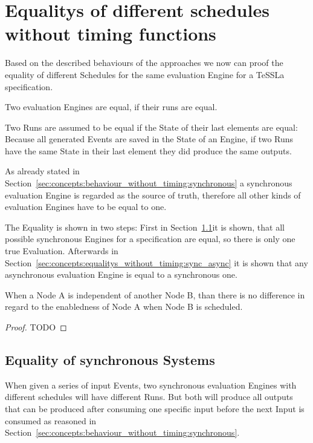 \section{Equalitys of different schedules without timing functions}
\label{sec:concepts:equalitys_without_timing}

Based on the described behaviours of the approaches we now can proof the equality of different Schedules for the same evaluation Engine for a TeSSLa specification.

\begin{lemma}
  Two evaluation Engines are equal, if their runs are equal.
\label{lemma:eval_equal_if_runs_equal}
\end{lemma}

Two Runs are assumed to be equal if the State of their last elements are equal:
Because all generated Events are saved in the State of an Engine, if two Runs have the same State in their last element they did produce the same outputs.


As already stated in Section~\ref{sec:concepts:behaviour_without_timing:synchronous} a synchronous evaluation Engine is regarded as the source of truth, therefore all other kinds of evaluation Engines have to be equal to one.

The Equality is shown in two steps: First in Section~\ref{sec:concepts:equalitys_without_timing:synchronous}it is shown, that all possible synchronous Engines for a specification are equal, so there is only one true Evaluation.
Afterwards in Section~\ref{sec:concepts:equalitys_without_timing:sync_async} it is shown that any asynchronous evaluation Engine is equal to a synchronous one.

\begin{lemma}
When a Node A is independent of another Node B, than there is no difference in regard to the enabledness of Node A when Node B is scheduled.
\label{lemma:independence}
\end{lemma}
\begin{proof}
  TODO
\end{proof}

\subsection{Equality of synchronous Systems}
\label{sec:concepts:equalitys_without_timing:synchronous}

When given a series of input Events, two synchronous evaluation Engines with different schedules will have different Runs.
But both will produce all outputs that can be produced after consuming one specific input before the next Input is consumed as reasoned in Section~\ref{sec:concepts:behaviour_without_timing:synchronous}.

